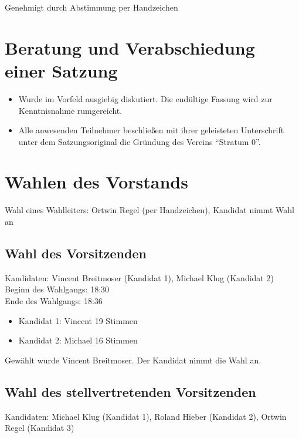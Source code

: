 \documentclass[a4paper,12pt]{scrartcl}
\begin{document}
Genehmigt durch Abstimmung per Handzeichen

\section{Beratung und Verabschiedung einer Satzung}

\begin{itemize}
    \item Wurde im Vorfeld ausgiebig diskutiert. Die endültige Fassung wird zur
        Kenntnisnahme
rumgereicht.
    \item Alle anwesenden Teilnehmer beschließen mit ihrer geleisteten
        Unterschrift unter dem Satzungsoriginal die Gründung des Vereins
        "`Stratum 0"'.
\end{itemize}

\pagebreak

\section{Wahlen des Vorstands}

Wahl eines Wahlleiters: Ortwin Regel (per Handzeichen), Kandidat nimmt Wahl an

\subsection{Wahl des Vorsitzenden}

Kandidaten: Vincent Breitmoser (Kandidat 1), Michael Klug (Kandidat 2) \\

Beginn des Wahlgangs: 18:30 \\
Ende des Wahlgangs: 18:36

\begin{itemize}
    \item Kandidat 1: Vincent 19 Stimmen
    \item Kandidat 2: Michael 16 Stimmen
\end{itemize}

Gewählt wurde Vincent Breitmoser. Der Kandidat nimmt die Wahl an.

\subsection{Wahl des stellvertretenden Vorsitzenden}

Kandidaten: Michael Klug (Kandidat 1), Roland Hieber (Kandidat 2), Ortwin Regel
(Kandidat 3) \\
\end{document}
